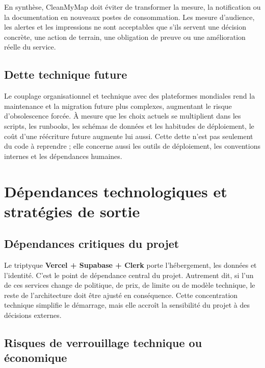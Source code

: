 \documentclass[
  10pt,
  a4paper,
  DIV=11,
  numbers=noendperiod,
  oneside]{scrreprt}
\let\oldtextbf\textbf
\renewcommand{\textbf}[1]{\oldtextbf{\textcolor{cmmnavy}{#1}}}
\begin{document}
En synthèse, CleanMyMap doit éviter de transformer la mesure, la
notification ou la documentation en nouveaux postes de consommation. Les
mesure d'audience, les alertes et les impressions ne sont acceptables
que s'ils servent une décision concrète, une action de terrain, une
obligation de preuve ou une amélioration réelle du service.

\subsection{Dette technique future}\label{dette-technique-future}

Le couplage organisationnel et technique avec des plateformes mondiales
rend la maintenance et la migration future plus complexes, augmentant le
risque d'obsolescence forcée. À mesure que les choix actuels se
multiplient dans les scripts, les runbooks, les schémas de données et
les habitudes de déploiement, le coût d'une réécriture future augmente
lui aussi. Cette dette n'est pas seulement du code à reprendre ; elle
concerne aussi les outils de déploiement, les conventions internes et
les dépendances humaines.

\section{Dépendances technologiques et stratégies de
sortie}\label{duxe9pendances-technologiques-et-stratuxe9gies-de-sortie}

\subsection{Dépendances critiques du
projet}\label{duxe9pendances-critiques-du-projet}

Le triptyque \textbf{Vercel + Supabase + Clerk} porte l'hébergement, les
données et l'identité. C'est le point de dépendance central du projet.
Autrement dit, si l'un de ces services change de politique, de prix, de
limite ou de modèle technique, le reste de l'architecture doit être
ajusté en conséquence. Cette concentration technique simplifie le
démarrage, mais elle accroît la sensibilité du projet à des décisions
externes.

\subsection{Risques de verrouillage technique ou
économique}\label{risques-de-verrouillage-technique-ou-uxe9conomique}
\end{document}
